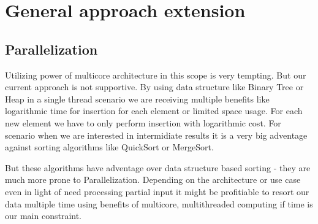 \section{General approach extension}
\subsection{Parallelization}

Utilizing power of multicore architecture in this scope is very tempting.
But our current approach is not supportive. By using data structure like Binary Tree
or Heap in a single thread scenario we are receiving multiple benefits like logarithmic time 
for insertion for each element or limited space usage. For each new element we have to only perform
insertion with logarithmic cost. For scenario when we are interested in intermidiate results it is 
a very big adventage against sorting algorithms like QuickSort or MergeSort.

But these algorithms have adventage over data structure based sorting - they are much
more prone to Parallelization. Depending on the architecture or use case even in light 
of need processing partial input it might be profitiable to resort our data multiple
time using benefits of multicore, multithreaded computing if time is our main constraint.



